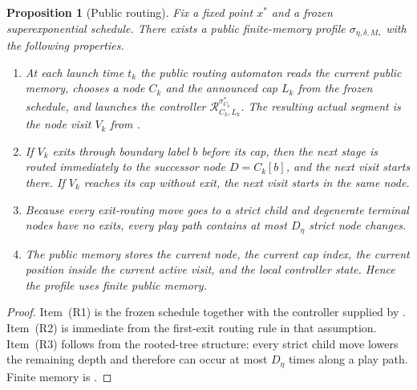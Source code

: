 \documentclass[12pt]{article}
\newtheorem{proposition}[theorem]{Proposition}
\theoremstyle{definition}
\newcommand{\1}{\mathbf{1}}
\begin{document}
\begin{proposition}[Public routing]
\label{prop:public-routing}
Fix a fixed point $x^*$ and a frozen superexponential schedule. There exists a
public finite-memory profile $\sigma_{\eta,\delta,M_*}$ with the following
properties.
\begin{enumerate}[label=\textnormal{(R\arabic*)},leftmargin=2.8em]
\item At each launch time $t_k$ the public routing automaton reads the current
public memory, chooses a node $C_k$ and the announced cap $L_k$ from the frozen
schedule, and launches the controller $\mathcal R_{C_k,L_k}^{\sigma_{C_k}^*}$.
The resulting actual segment is the node visit $V_k$ from
.
\item If $V_k$ exits through boundary label $b$ before its cap, then the next
stage is routed immediately to the successor node $D=C_k[b]$, and the next visit
starts there. If $V_k$ reaches its cap without exit, the next visit starts in the
same node.
\item Because every exit-routing move goes to a strict child and degenerate
terminal nodes have no exits, every play path contains at most $D_\eta$ strict
node changes.
\item The public memory stores the current node, the current cap index, the
current position inside the current active visit, and the local controller state.
Hence the profile uses finite public memory.
\end{enumerate}
\end{proposition}

\begin{proof}
Item~(R1) is the frozen schedule together with the controller supplied by
. Item~(R2) is immediate from the first-exit routing
rule in that assumption. Item~(R3) follows from the rooted-tree structure: every
strict child move lowers the remaining depth and therefore can occur at most
$D_\eta$ times along a play path. Finite memory is .
\end{proof}
\end{document}

